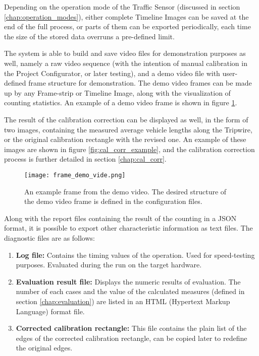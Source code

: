 Depending on the operation mode of the Traffic Sensor (discussed in section \ref{chap:operation_modes}), either complete Timeline Images can be saved at the end of the full process, or parts of them can be exported periodically, each time the size of the stored data overruns a pre-defined limit.

The system is able to build and save video files for demonstration purposes as well, namely a raw video sequence (with the intention of manual calibration in the Project Configurator, or later testing), and a demo video file with user-defined frame structure for demonstration.
The demo video frames can be made up by any Frame-strip or Timeline Image, along with the visualization of counting statistics.
An example of a demo video frame is shown in figure \ref{fig:demo_video}.

The result of the calibration correction can be displayed as well, in the form of two images, containing the measured average vehicle lengths along the Tripwire, or the original calibration rectangle with the revised one. 
An example of these images are shown in figure \ref{fig:cal_corr_example}, and the calibration correction process is further detailed in section \ref{chap:cal_corr}.

\begin{figure}[!h]
	\centering
	\texttt{[image: frame\_demo\_vide.png]}
	\caption[Example frame from the demo video]{An example frame from the demo video. The desired structure of the demo video frame is defined in the configuration files.  \label{fig:demo_video}}
\end{figure}

Along with the report files containing the result of the counting in a JSON format, it is possible to export other characteristic information as text files.
The diagnostic files are as follows:
\begin{enumerate}
	\item \textbf{Log file: } Contains the timing values of the operation. Used for speed-testing purposes. Evaluated during the run on the target hardware.
	\item \textbf{Evaluation result file: } Displays the numeric results of evaluation. The number of each cases and the value of the calculated measures (defined in section \ref{chap:evaluation}) are listed in an HTML (Hypertext Markup Language) format file.
	\item \textbf{Corrected calibration rectangle: } This file contains the plain list of the edges of the corrected calibration rectangle, can be copied later to redefine the original edges.
\end{enumerate}

